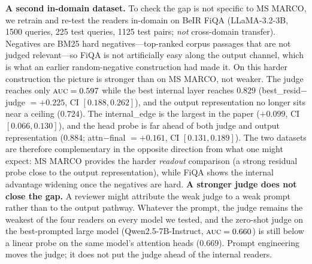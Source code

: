 \documentclass[11pt]{article}
\newcommand{\auc}{\textsc{auc}}
\begin{document}
\textbf{A second in-domain dataset.} To check the gap is not specific to
MS MARCO, we retrain and re-test the readers in-domain on BeIR FiQA
(LLaMA-3.2-3B, 1500 queries, 225 test queries, 1125 test pairs; \emph{not}
cross-domain transfer). Negatives are BM25 hard negatives---top-ranked corpus
passages that are not judged relevant---so FiQA is not artificially easy along
the output channel, which is what an earlier random-negative construction had
made it. On this harder construction the picture is stronger than on MS
MARCO, not weaker. The judge reaches only $\auc{}=0.597$ while the best
internal layer reaches $0.829$ (best\_resid$-$judge $=+0.225$, CI
$[0.188,0.262]$), and the output representation no longer sits near a ceiling
($0.724$). The internal\_edge is the largest in the paper
($+0.099$, CI $[0.066,0.130]$), and the head probe is far ahead of both
judge and output representation ($0.884$; attn$-$final $=+0.161$, CI
$[0.131,0.189]$). The two datasets are therefore complementary in the
opposite direction from what one might expect: MS MARCO provides the harder
\emph{readout} comparison (a strong residual probe close to the output
representation), while FiQA shows the internal advantage widening once the
negatives are hard.
\textbf{A stronger judge does not close the gap.} A reviewer might attribute
the weak judge to a weak prompt rather than to the output pathway. Whatever
the prompt, the judge remains the weakest of the four readers on every model we
tested, and the zero-shot judge on the best-prompted large model
(Qwen2.5-7B-Instruct, $\auc{}=0.660$) is still below a linear probe on the same
model's attention heads ($0.669$). Prompt engineering moves the judge; it does
not put the judge ahead of the internal readers.
\end{document}

